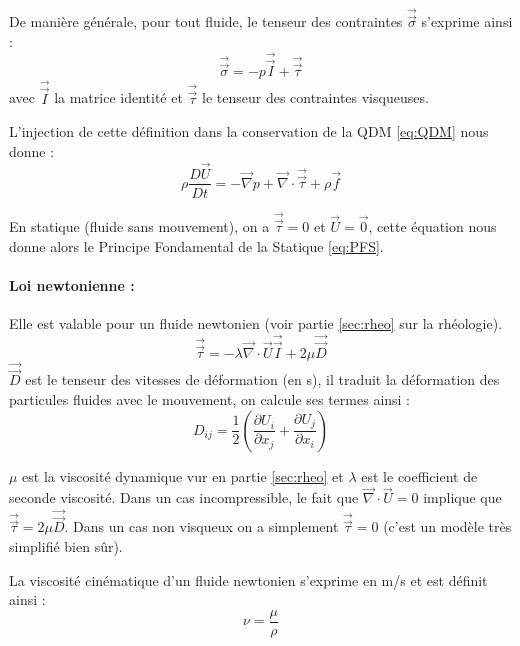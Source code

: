 
De manière générale, pour tout fluide, le tenseur des contraintes $\vec{\vec{\sigma}}$ s'exprime ainsi :
%
\begin{equation}
\vec{\vec{\sigma}} = - p \vec{\vec{I}} + \vec{\vec{\tau}}
\end{equation}
%
avec $\vec{\vec{I}}$ la matrice identité et $\vec{\vec{\tau}}$ le tenseur des contraintes visqueuses.

L'injection de cette définition dans la conservation de la QDM \eqref{eq:QDM} nous donne :
%
\begin{equation}
\rho \frac{D\vec{U}}{Dt} = - \vec{\nabla} p + \vec{\nabla} \cdot \vec{\vec{\tau}} + \rho \vec{f}
\end{equation}

En statique (fluide sans mouvement), on a $\vec{\vec{\tau}} = 0$ et $\vec{U} = \vec{0}$, cette équation nous donne alors le Principe Fondamental de la Statique \eqref{eq:PFS}.

\paragraph{Loi newtonienne :}Elle est valable pour un fluide newtonien (voir partie \ref{sec:rheo} sur la rhéologie).
%
\begin{equation}
\vec{\vec{\tau}} = - \lambda \vec{\nabla} \cdot \vec{U} \vec{\vec{I}} + 2\mu \vec{\vec{D}}
\end{equation}
%
$\vec{\vec{D}}$ est le tenseur des vitesses de déformation (en s), il traduit la déformation des particules fluides avec le mouvement, on calcule ses termes ainsi :
%
\begin{equation}
D_{ij} = \frac{1}{2} \left( \frac{\partial{U_i}}{\partial{x_j}} + \frac{\partial{U_j}}{\partial{x_i}} \right)
\end{equation}

$\mu$ est la viscosité dynamique vur en partie \ref{sec:rheo} et $\lambda$ est le coefficient de seconde viscosité. Dans un cas incompressible, le fait que $\vec{\nabla} \cdot \vec{U} = 0$ implique que $\vec{\vec{\tau}} = 2 \mu \vec{\vec{D}}$. Dans un cas non visqueux on a simplement $\vec{\vec{\tau}} = 0$ (c'est un modèle très simplifié bien sûr).

La viscosité cinématique d'un fluide newtonien s'exprime en m/s et est définit ainsi :
%
\begin{equation}
\nu = \frac{\mu}{\rho}
\end{equation}

